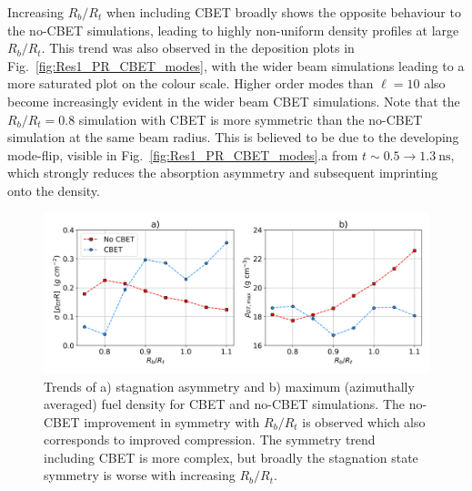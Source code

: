 Increasing $R_b/R_t$ when including \ac{CBET} broadly shows the opposite behaviour to the no-\ac{CBET} simulations, leading to highly non-uniform density profiles at large $R_b/R_t$.
This trend was also observed in the deposition plots in Fig.~\ref{fig:Res1_PR_CBET_modes}, with the wider beam simulations leading to a more saturated plot on the colour scale.
Higher order modes than $\ell=10$ also become increasingly evident in the wider beam \ac{CBET} simulations.
Note that the $R_b/R_t=0.8$ simulation with \ac{CBET} is more symmetric than the no-\ac{CBET} simulation at the same beam radius.
This is believed to be due to the developing mode-flip, visible in Fig.~\ref{fig:Res1_PR_CBET_modes}.a from $t\sim 0.5\rightarrow 1.3\ \text{ns}$, which strongly reduces the absorption asymmetry and subsequent imprinting onto the density.

\begin{figure}[t!]
    \includegraphics[width=1.0\linewidth]{Results1/Images/RbRt_sig_rhomax.png}
    \centering
    \caption{Trends of a) stagnation asymmetry and b) maximum (azimuthally averaged) fuel density for \ac{CBET} and no-\ac{CBET} simulations.
    The no-\ac{CBET} improvement in symmetry with $R_b/R_t$ is observed which also corresponds to improved compression.
    The symmetry trend including \ac{CBET} is more complex, but broadly the stagnation state symmetry is worse with increasing $R_b/R_t$.}%
    \label{fig:Res1_asymm_trend}
\end{figure}

